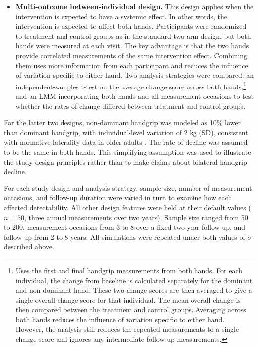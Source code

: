 \documentclass[twocolumn]{article} %
\begin{document}
\begin{itemize}
	\item[-] \textbf{Multi-outcome between-individual design.} This design applies when the intervention is expected to have a systemic effect. In other words, the intervention is expected to affect both hands. Participants were randomized to treatment and control groups as in the standard two-arm design, but both hands were measured at each visit. The key advantage is that the two hands provide correlated measurements of the same intervention effect. Combining them uses more information from each participant and reduces the influence of variation specific to either hand. Two analysis strategies were compared: an independent-samples t-test on the average change score across both hands,\footnote{Uses the first and final handgrip measurements from both hands. For each individual, the change from baseline is calculated separately for the dominant and non-dominant hand. These two change scores are then averaged to give a single overall change score for that individual. The mean overall change is then compared between the treatment and control groups. Averaging across both hands reduces the influence of variation specific to either hand. However, the analysis still reduces the repeated measurements to a single change score and ignores any intermediate follow-up measurements.} and an LMM incorporating both hands and all measurement occasions to test whether the rates of change differed between treatment and control groups.

\end{itemize}

For the latter two designs, non-dominant handgrip was modeled as 10\% lower than dominant handgrip, with individual-level variation of 2 kg (SD), consistent with normative laterality data in older adults \cite{cuyul2025one}\cite{zadon2025analyzing}. The rate of decline was assumed to be the same in both hands. This simplifying assumption was used to illustrate the study-design principles rather than to make claims about bilateral handgrip decline.

For each study design and analysis strategy, sample size, number of measurement occasions, and follow-up duration were varied in turn to examine how each affected detectability. All other design features were held at their default values ($n = 50$, three annual measurements over two years). Sample size ranged from 50 to 200, measurement occasions from 3 to 8 over a fixed two-year follow-up, and follow-up from 2 to 8 years. All simulations were repeated under both values of $σ$ described above.
\end{document}
